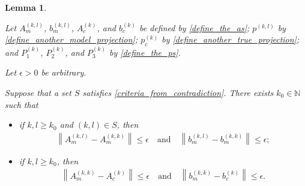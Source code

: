 \documentclass{article}
\newtheorem{lemma}[theorem]{Lemma}
\theoremstyle{case}
\numberwithin{theorem}{subsection}
\newcommand{\naturals}{\mathbb N}
\newcommand{\projkl}{{p^{(k,l)}}}
\newcommand{\trueprojk}{{p_c^{(k)}}}
\begin{document}
\begin{lemma}
\label{the_polyhedron_are_close}

Let $A_{m}^{(k, l)}$, $b_{m}^{(k, l)}$, $A_{c}^{(k)}$, and $b_{c}^{(k)}$ be defined by \cref{define_the_as};
$\projkl$ by \cref{define_another_model_projection};
$\trueprojk$ by \cref{define_another_true_projection};
and $P^{(k)}_1$, $P^{(k)}_2$, and $P^{(k)}_3$ by \cref{define_the_ps}.

Let $\epsilon > 0$ be arbitrary.

Suppose that a set $S$ satisfies \cref{criteria_from_contradiction}.
There exists $k_0 \in \naturals$ such that 

\begin{itemize}
\item if $k, l \ge k_0$ and $(k, l) \in S$, then
\begin{align*}
\left\|A_{m}^{(k, l)} - A_{m}^{(k, k)}\right\| \le \epsilon
\quad \textrm{and} \quad
\left\|b_{m}^{(k, l)} - b_{m}^{(k, k)}\right\| \le \epsilon;
\end{align*}
\item if $k, l \ge k_0$, then
\begin{align*}
\left\|A_{m}^{(k, k)} - A_{c}^{(k)}\right\| \le \epsilon
\quad \textrm{and} \quad
\left\|b_{m}^{(k, k)} - b_{c}^{(k)}\right\| \le \epsilon.
\end{align*}
\end{itemize}

\end{lemma}
\end{document}
